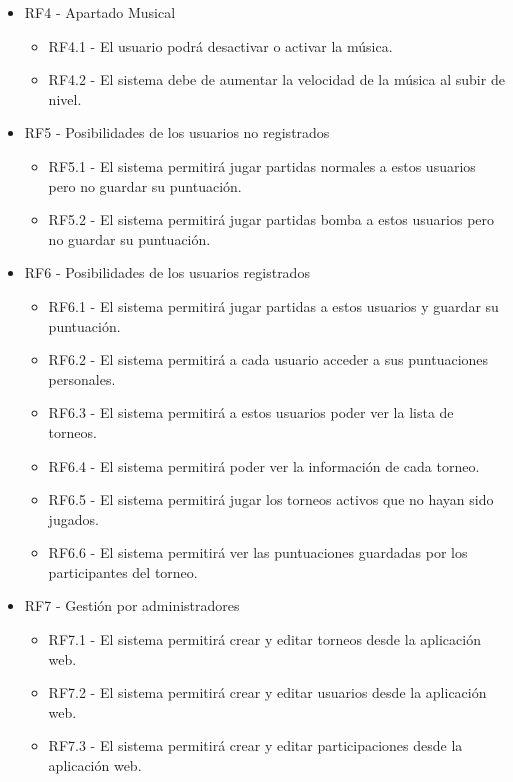 \documentclass{article}
\begin{document}
\begin{itemize}
    \item RF4 - Apartado Musical
    \begin{itemize}
      \item RF4.1 - El usuario podrá desactivar o activar la música.
      \item RF4.2 - El sistema debe de aumentar la velocidad de la música al subir de nivel.
    \end{itemize}

     \item RF5 - Posibilidades de los usuarios no registrados
     \begin{itemize}
      \item RF5.1 - El sistema permitirá jugar partidas normales a estos usuarios pero no guardar su puntuación.
      \item RF5.2 - El sistema permitirá jugar partidas bomba a estos usuarios pero no guardar su puntuación.
    \end{itemize}

    \item RF6 - Posibilidades de los usuarios registrados
     \begin{itemize}
      \item RF6.1 - El sistema permitirá jugar partidas a estos usuarios y guardar su puntuación.
      \item RF6.2 - El sistema permitirá a cada usuario acceder a sus puntuaciones personales.
      \item RF6.3 - El sistema permitirá a estos usuarios poder ver la lista de torneos.
      \item RF6.4 - El sistema permitirá poder ver la información de cada torneo.
      \item RF6.5 - El sistema permitirá jugar los torneos activos que no hayan sido jugados.
      \item RF6.6 - El sistema permitirá ver las puntuaciones guardadas por los participantes del torneo.
      
    \end{itemize}

    \item RF7 - Gestión por administradores
    \begin{itemize}
      \item RF7.1 - El sistema permitirá crear y editar torneos desde la aplicación web.
      \item RF7.2 - El sistema permitirá crear y editar usuarios desde la aplicación web.
      \item RF7.3 - El sistema permitirá crear y editar participaciones desde la aplicación web.


\end{itemize}
\end{itemize}
\end{document}
